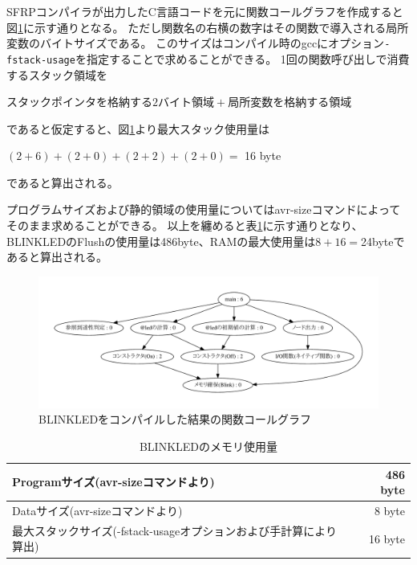 SFRPコンパイラが出力したC言語コードを元に関数コールグラフを作成すると図\ref{fig:imp:call_graph}に示す通りとなる。
ただし関数名の右横の数字はその関数で導入される局所変数のバイトサイズである。
このサイズはコンパイル時のgccにオプション\texttt{-fstack-usage}を指定することで求めることができる。
1回の関数呼び出しで消費するスタック領域を
\begin{center}
$スタックポインタを格納する2バイト領域 + 局所変数を格納する領域$
\end{center}
であると仮定すると、図\ref{fig:imp:call_graph}より最大スタック使用量は
\begin{center}
$(2 + 6) + (2 + 0) + (2 + 2) + (2 + 0) =$ 16 byte\\
\end{center}
であると算出される。

プログラムサイズおよび静的領域の使用量についてはavr-sizeコマンドによってそのまま求めることができる。
以上を纏めると表\ref{fig:imp:size}に示す通りとなり、
BLINKLEDのFlushの使用量は486byte、RAMの最大使用量は$8+16=$24byteであると算出される。

\begin{figure}[h]
 \begin{center}
  \includegraphics[width=160mm]{figure/call_graph.pdf}
 \end{center}
 \caption{BLINKLEDをコンパイルした結果の関数コールグラフ}
 \label{fig:imp:call_graph}
\end{figure}

\begin{table}[h]
  \centering
  \begin{tabular}{l|r}
    Programサイズ(avr-sizeコマンドより) & 486 byte \\ \hline
    Dataサイズ(avr-sizeコマンドより) & 8 byte \\ \hline
    最大スタックサイズ(-fstack-usageオプションおよび手計算により算出)  & 16 byte \\ \hline
  \end{tabular}
\caption{BLINKLEDのメモリ使用量}
\label{fig:imp:size}
\end{table}


